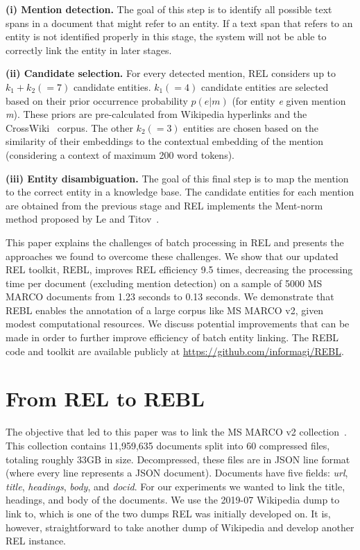 \textbf{(i) Mention detection.} The goal of this step is to identify all possible text spans in a document that might refer to an entity. If a text span that refers to an entity is not identified properly in this stage, the system will not be able to correctly link the entity in later stages.

\textbf{(ii) Candidate selection.} For every detected mention, REL considers up to $k_1 + k_2 (=7)$ candidate entities. $k_1 (=4)$ candidate entities are selected based on their prior occurrence probability $p(e|m)$ (for entity \textit{e} given mention \textit{m}). These priors are pre-calculated from Wikipedia hyperlinks and the CrossWiki~\cite{cross-wiki} corpus. The other $k_2 (=3)$ entities are chosen based on the similarity of their embeddings to the contextual embedding of the mention (considering a context of maximum 200 word tokens).

\textbf{(iii) Entity disambiguation.} The goal of this final step is to map the mention to the correct entity in a knowledge base. The candidate entities for each mention are obtained from the previous stage and REL implements the Ment-norm method proposed by Le and Titov~\cite{ED-paper}. 

This paper explains the challenges of batch processing in REL and presents the approaches we found to overcome these challenges. We show that our updated REL toolkit, REBL, improves REL efficiency 9.5 times, decreasing the processing time per document (excluding mention detection) on a sample of 5000 MS MARCO documents from 1.23 seconds to 0.13 seconds. We demonstrate that REBL enables the annotation of a large corpus like MS MARCO v2, given modest computational resources. We discuss potential improvements that can be made in order to further improve efficiency of batch entity linking. The REBL code and toolkit are available publicly at \url{https://github.com/informagi/REBL}.

\section{From REL to REBL}
The objective that led to this paper was to link the MS MARCO v2 collection~\cite{msmarco}. This collection contains 11,959,635 documents split into 60 compressed files, totaling roughly 33GB in size. Decompressed, these files are in JSON line format (where every line represents a JSON document). Documents have five fields: \textit{url}, \textit{title}, \textit{headings}, \textit{body}, and \textit{docid}. For our experiments we wanted to link the title, headings, and body of the documents.  We use the 2019-07 Wikipedia dump to link to, which is one of the two dumps REL was initially developed on. It is, however, straightforward to take another dump of Wikipedia and develop another REL instance. 

